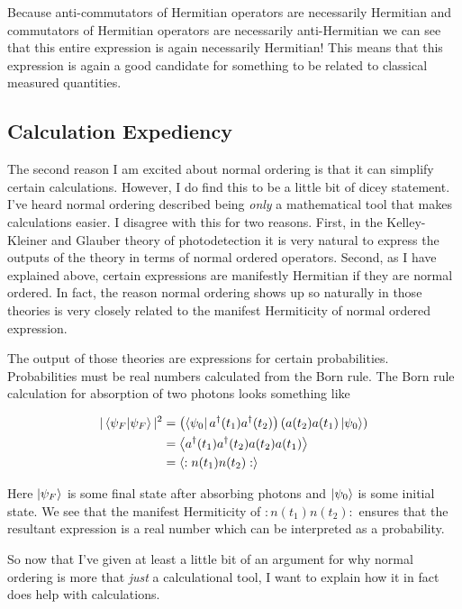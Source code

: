 \documentclass[12pt]{article}
\begin{document}
Because anti-commutators of Hermitian operators are necessarily Hermitian and commutators of Hermitian operators are necessarily anti-Hermitian we can see that this entire expression is again necessarily Hermitian! This means that this expression is again a good candidate for something to be related to classical measured quantities.

\subsection{Calculation Expediency}

The second reason I am excited about normal ordering is that it can simplify certain calculations. However, I do find this to be a little bit of dicey statement. I've heard normal ordering described being \textit{only} a mathematical tool that makes calculations easier. I disagree with this for two reasons. First, in the Kelley-Kleiner and Glauber theory of photodetection it is very natural to express the outputs of the theory in terms of normal ordered operators. Second, as I have explained above, certain expressions are manifestly Hermitian if they are normal ordered. In fact, the reason normal ordering shows up so naturally in those theories is very closely related to the manifest Hermiticity of normal ordered expression. 

The output of those theories are expressions for certain probabilities. Probabilities must be real numbers calculated from the Born rule. The Born rule calculation for absorption of two photons looks something like

\begin{align}
|\braket{\psi_F|\psi_F}|^2 &= \left(\bra{\psi_0}a^{\dag}(t_1)a^{\dag}(t_2) \right)\left(a(t_2)a(t_1)\ket{\psi_0}\right)\\
&= \Braket{a^{\dag}(t_1)a^{\dag}(t_2)a(t_2)a(t_1)}\\
&= \Braket{:n(t_1)n(t_2):}
\end{align}

Here $\ket{\psi_F}$ is some final state after absorbing photons and $\ket{\psi_0}$ is some initial state. We see that the manifest Hermiticity of $:n(t_1)n(t_2):$ ensures that the resultant expression is a real number which can be interpreted as a probability.

So now that I've given at least a little bit of an argument for why normal ordering is more that \textit{just} a calculational tool, I want to explain how it in fact does help with calculations.
\end{document}
